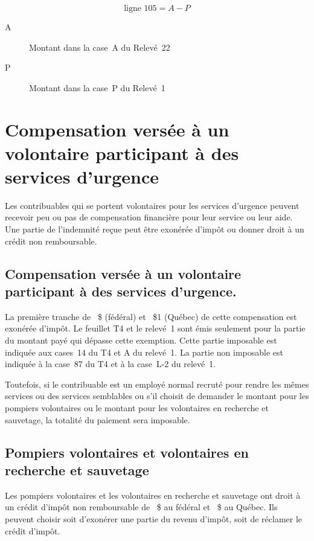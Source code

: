 \[ \text{ligne~105} = A - P\]
\begin{description}
	\item[A] Montant dans la case~A du Relevé~22
	\item[P] Montant dans la case~P du Relevé~1
\end{description}



\section{Compensation versée à un volontaire participant à des services d'urgence}
\begin{intro}
	Les contribuables qui se portent volontaires pour les services d'urgence peuvent recevoir peu ou pas de compensation financière pour leur service ou leur aide. Une partie de l'indemnité reçue peut être exonérée d'impôt ou donner droit à un crédit non remboursable.
\end{intro}


\subsection{Compensation versée à un volontaire participant à des services d'urgence.}
La première tranche de ~\$ (fédéral) et ~\$1 (Québec) de cette compensation est exonérée d'impôt. Le feuillet T4 et le relevé~1 sont émis seulement pour la partie du montant payé qui dépasse cette exemption. Cette partie imposable est indiquée aux cases~14 du T4 et A du relevé~1. La partie non imposable est indiquée à la case~87 du T4 et à la case~\og L-2\fg{} du relevé~1.

Toutefois, si le contribuable est un employé normal recruté pour rendre les mêmes services ou des services semblables ou s'il choisit de demander le montant pour les pompiers volontaires ou le montant pour les volontaires en recherche et sauvetage, la totalité du paiement sera imposable.


\subsection{Pompiers volontaires et volontaires en recherche et sauvetage}
Les pompiers volontaires et les volontaires en recherche et sauvetage ont droit à un crédit d'impôt non remboursable de  ~\$ au fédéral et  ~\$ au Québec. Ils peuvent choisir soit d'exonérer une partie du revenu d'impôt, soit de réclamer le crédit d'impôt. 



